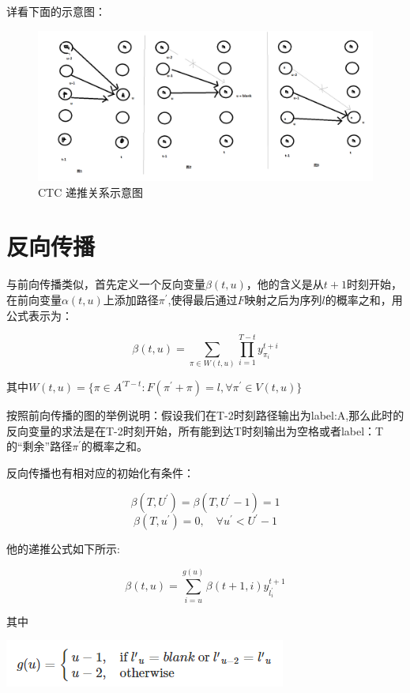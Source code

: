 \documentclass[]{book}
\theoremstyle{definition}
\theoremstyle{definition}
\theoremstyle{definition}
\theoremstyle{remark}
\begin{document}
详看下面的示意图：

\begin{figure}

{\centering \includegraphics[width=1\linewidth]{pic/fig_4} 

}

\caption{CTC 递推关系示意图}\label{fig:unnamed-chunk-5}
\end{figure}

\section{反向传播}

与前向传播类似，首先定义一个反向变量\(\beta(t,u)\)，他的含义是从\(t+1\)时刻开始，在前向变量\(\alpha(t,u)\)上添加路径\(\pi^{'}\),使得最后通过\(F\)映射之后为序列\(l\)的概率之和，用公式表示为：

\[\beta(t,u) = \sum_{\pi \in W(t,u)} \prod_{i=1}^{T-t}y_{\pi_i}^{t+i}\]

其中\(W(t,u) = \{\pi \in A^{'T-t}: F(\pi^{'}+\pi)=l, \forall \pi^{'} \in V(t,u) \}\)

按照前向传播的图的举例说明：假设我们在T-2时刻路径输出为label:A,那么此时的反向变量的求法是在T-2时刻开始，所有能到达T时刻输出为空格或者label：T的``剩余''路径\(\pi^{'}\)的概率之和。

反向传播也有相对应的初始化有条件：

\[\beta(T,U^{'})=\beta(T,U^{'}-1)=1\]
\[\beta(T,u^{'}) = 0, \quad \forall u^{'} < U^{'}-1\]

他的递推公式如下所示:

\[\beta(t,u) = \sum_{i=u}^{g(u)}\beta(t+1,i)y_{l_{i}^{'}}^{t+1}\]

其中

\begin{center}\includegraphics[width=1.5\linewidth]{pic/fig_6} \end{center}
\end{document}

